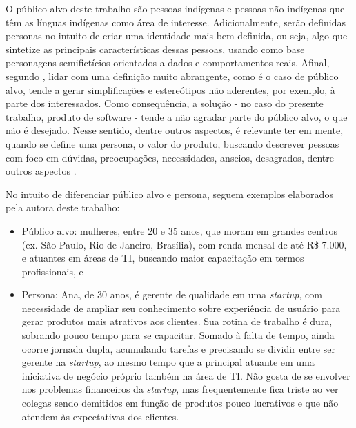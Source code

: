 O público alvo deste trabalho são pessoas indígenas e pessoas não indígenas que têm as línguas 
indígenas como área de interesse. Adicionalmente, serão definidas personas no intuito de criar uma 
identidade mais bem definida, ou seja, algo que sintetize as principais características dessas pessoas, 
usando como base personagens semifictícios orientados a dados e comportamentos reais. Afinal, segundo 
, lidar com uma definição muito abrangente, como é o caso de público alvo, tende a gerar 
simplificações e estereótipos não aderentes, por exemplo, à parte dos interessados. Como consequência, 
a solução - no caso do presente trabalho, produto de software - tende a não agradar parte do público alvo, 
o que não é desejado. Nesse sentido, dentre outros aspectos, é relevante ter em mente, quando se define uma 
persona, o valor do produto, buscando descrever pessoas com foco em dúvidas, preocupações, necessidades, anseios, 
desagrados, dentre outros aspectos \cite{barbosa2010}.

\begin{description}
  \item No intuito de diferenciar público alvo e persona, seguem exemplos elaborados pela autora deste trabalho:
        \begin{itemize}
            \item Público alvo: mulheres, entre 20 e 35 anos, que moram em grandes centros (ex. São Paulo, Rio de Janeiro, Brasília), 
            com renda mensal de até R\$ 7.000, e atuantes em áreas de TI, buscando maior capacitação em termos profissionais, e

            \item Persona: Ana, de 30 anos, é gerente de qualidade em uma \textit{startup}, com necessidade de ampliar seu conhecimento sobre 
            experiência de usuário para gerar produtos mais atrativos aos clientes. Sua rotina de trabalho é dura, sobrando pouco 
            tempo para se capacitar. Somado à falta de tempo, ainda ocorre jornada dupla, acumulando tarefas e precisando se dividir 
            entre ser gerente na \textit{startup}, ao mesmo tempo que a principal atuante em uma iniciativa de negócio próprio também na área de TI. 
            Não gosta de se envolver nos problemas financeiros da \textit{startup}, mas frequentemente fica triste ao ver colegas sendo demitidos em 
            função de produtos pouco lucrativos e que não atendem às expectativas dos clientes.
        \end{itemize}
\end{description}

